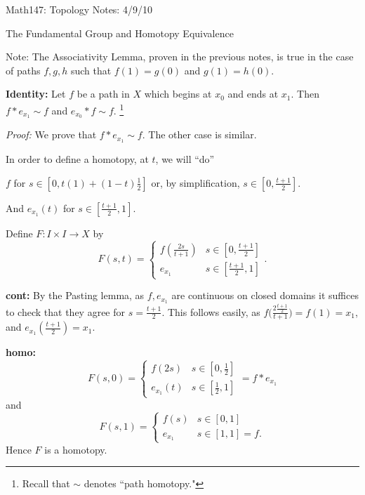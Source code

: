 \documentclass[12pt,letterpaper,boxed]{article}
\begin{document}
Math147: Topology Notes: 4/9/10\\

\begin{center}{\Large The Fundamental Group and Homotopy Equivalence}
\end{center}
\normalsize
\vspace{.2in}

Note: The Associativity Lemma, proven in the previous notes, is true in the case of paths $f,g,h$ such that $f(1)=g(0)$ and $g(1)=h(0)$.
\vspace{.2in}

{\bf \large Identity:  }\normalsize  Let $f$ be a path in $X$ which begins at $x_0$ and ends at $x_1$.  Then $f*e_{x_1}\sim f$ and $e_{x_0}* f \sim f$. \footnote{Recall that $\sim$ denotes ``path homotopy."}


\emph{Proof:} \indent We prove that $f* e_{x_1}\sim f$.  The other case is similar.
\vspace{.1in}

In order to define a homotopy, at $t$, we will ``do'' 

$f$ for $s\in [0,t(1)+(1-t)\tfrac{1}{2}]$ or, by simplification, $s\in[0,\tfrac{t+1}{2}]$.

And $e_{x_1}(t)$ for $s\in [\tfrac{t+1}{2},1]$.\\ 
\vspace{.1in}

Define $F:I\times I \to X$ by $$F(s,t)=\begin{cases} f(\tfrac{2s}{t+1}) & s\in [0,\tfrac{t+1}{2}]\\ e_{x_1} & s\in [\frac{t+1}{2},1]\end{cases}.$$
\vspace{.6in}

{\bf cont:}
By the Pasting lemma, as $f, e_{x_1}$ are continuous on closed domains it suffices to check that they agree for $s=\tfrac{t+1}{2}$.
This follows easily, as $f\big(\frac{2\tfrac{t+1}{2}}{t+1}\big)=f(1)=x_1$, and $e_{x_1}(\tfrac{t+1}{2})=x_1$. 
\vspace{.6in}

{\bf homo:}
$$F(s,0)=\begin{cases}f(2s) & s\in[0,\tfrac{1}{2}]\\ e_{x_1}(t) & s\in[\tfrac{1}{2},1]\end{cases} = f*e_{x_1}$$
and
$$F(s,1)=\begin{cases} f(s) & s\in [0,1]\\ e_{x_1} & s\in [1,1]=f.\end{cases}$$ Hence $F$ is a homotopy.
\vspace{.6in}
\end{document}
